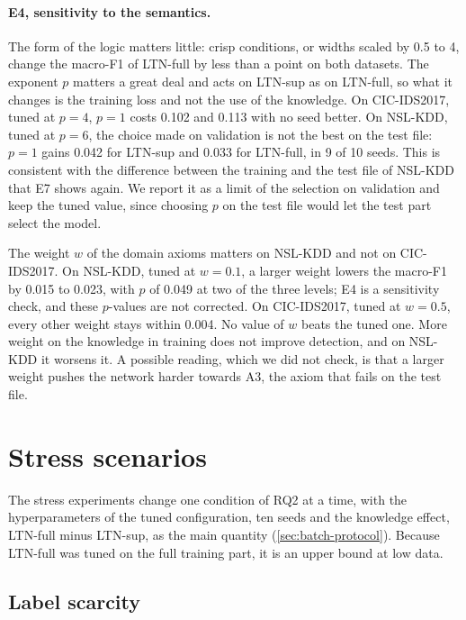 \paragraph{E4, sensitivity to the semantics.}
The form of the logic matters little: crisp conditions, or widths scaled by 0.5 to 4, change the macro-F1 of LTN-full by
less than a point on both datasets. The exponent $p$ matters a great deal and acts on LTN-sup as on LTN-full, so what it
changes is the training loss and not the use of the knowledge. On CIC-IDS2017, tuned at $p=4$, $p=1$ costs 0.102 and 0.113
with no seed better. On NSL-KDD, tuned at $p=6$, the choice made on validation is not the best on the test file: $p=1$
gains 0.042 for LTN-sup and 0.033 for LTN-full, in 9 of 10 seeds. This is consistent with the difference between the
training and the test file of NSL-KDD that E7 shows again. We report it as a limit of the selection on validation and keep
the tuned value, since choosing $p$ on the test file would let the test part select the model.

The weight $w$ of the domain axioms matters on NSL-KDD and not on CIC-IDS2017. On NSL-KDD, tuned at $w=0.1$, a larger
weight lowers the macro-F1 by 0.015 to 0.023, with $p$ of 0.049 at two of the three levels; E4 is a sensitivity check,
and these $p$-values are not corrected. On CIC-IDS2017, tuned at $w=0.5$, every other weight stays within 0.004. No value
of $w$ beats the tuned one. More weight on the knowledge in training does not improve detection, and on NSL-KDD it
worsens it. A possible reading, which we did not check, is that a larger weight pushes the network harder towards A3, the
axiom that fails on the test file.

\section{Stress scenarios}
\label{sec:res-stress}

The stress experiments change one condition of RQ2 at a time, with the hyperparameters of the tuned
configuration, ten seeds and the knowledge effect, LTN-full minus LTN-sup, as the main quantity
(\cref{sec:batch-protocol}). Because LTN-full was tuned on the full training part, it is an upper bound at low
data.

\subsection{Label scarcity}
\label{sec:res-scarcity}

